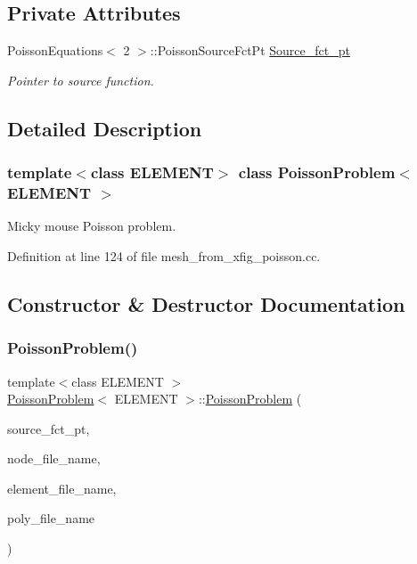\subsection*{Private Attributes}
\begin{DoxyCompactItemize}
\item 
Poisson\+Equations$<$ 2 $>$\+::Poisson\+Source\+Fct\+Pt \hyperlink{classPoissonProblem_a32b954cca3c38175d0816f92e1c0da46}{Source\+\_\+fct\+\_\+pt}
\begin{DoxyCompactList}\small\item\em Pointer to source function. \end{DoxyCompactList}\end{DoxyCompactItemize}


\subsection{Detailed Description}
\subsubsection*{template$<$class E\+L\+E\+M\+E\+NT$>$\newline
class Poisson\+Problem$<$ E\+L\+E\+M\+E\+N\+T $>$}

Micky mouse Poisson problem. 

Definition at line 124 of file mesh\+\_\+from\+\_\+xfig\+\_\+poisson.\+cc.



\subsection{Constructor \& Destructor Documentation}
\mbox{\label{classPoissonProblem_a80765a4c029f9659b631a80c583b58cc}} 
\subsubsection{\texorpdfstring{Poisson\+Problem()}{PoissonProblem()}}
{\footnotesize\ttfamily template$<$class E\+L\+E\+M\+E\+NT $>$ \\
\hyperlink{classPoissonProblem}{Poisson\+Problem}$<$ E\+L\+E\+M\+E\+NT $>$\+::\hyperlink{classPoissonProblem}{Poisson\+Problem} (\begin{DoxyParamCaption}\item[{Poisson\+Equations$<$ 2 $>$\+::Poisson\+Source\+Fct\+Pt}]{source\+\_\+fct\+\_\+pt,  }\item[{const string \&}]{node\+\_\+file\+\_\+name,  }\item[{const string \&}]{element\+\_\+file\+\_\+name,  }\item[{const string \&}]{poly\+\_\+file\+\_\+name }\end{DoxyParamCaption})}



